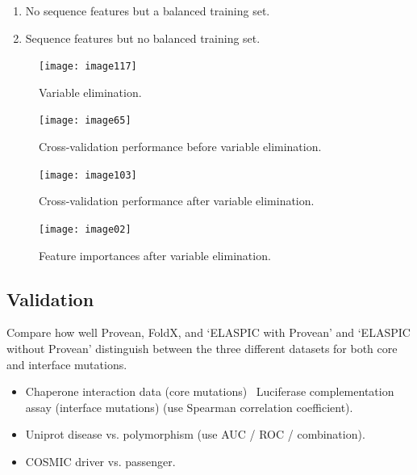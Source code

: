 \begin{enumerate}
	\item No sequence features but a balanced training set.
	\item Sequence features but no balanced training set.
\end{enumerate}


\begin{figure}[H]
	\centering
	\texttt{[image: image117]}
	\caption{Variable elimination.}
\end{figure}

\begin{figure}[H]
	\centering
	\texttt{[image: image65]}
	\caption{Cross-validation performance before variable elimination.}
\end{figure}

\begin{figure}[H]
	\centering
	\texttt{[image: image103]}
	\caption{Cross-validation performance after variable elimination.}
\end{figure}

\begin{figure}[H]
	\centering
	\texttt{[image: image02]}
	\caption{Feature importances after variable elimination.}
\end{figure}




\subsection{Validation}

Compare how well Provean, FoldX, and `ELASPIC with Provean' and `ELASPIC without Provean' distinguish between the three different datasets for both core and interface mutations.

\begin{itemize}
\item Chaperone interaction data (core mutations) \ Luciferase complementation assay (interface mutations) (use Spearman correlation coefficient).
\item Uniprot disease vs. polymorphism (use AUC / ROC / combination).
\item COSMIC driver vs. passenger.
\end{itemize}







